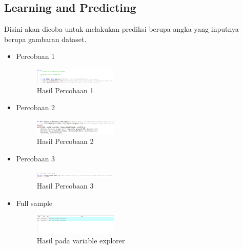 \subsection{Learning and Predicting}
Disini akan dicoba untuk melakukan prediksi berupa angka yang inputnya berupa gambaran dataset. 
\begin{itemize}
	\item Percobaan 1  \hfill \break 
	\begin{figure}[H]
		\includegraphics[width=4cm]{figures/1174035/chapter1/3_1_hasil.png}
		\centering
		\caption{Hasil Percobaan 1}
	\end{figure}
	\item Percobaan 2 \hfill \break 
	\begin{figure}[H]
		\includegraphics[width=4cm]{figures/1174035/chapter1/3_2_hasil.png}
		\centering
		\caption{Hasil Percobaan 2}
	\end{figure}
	\item Percobaan 3  \hfill \break 
	\begin{figure}[H]
		\includegraphics[width=4cm]{figures/1174035/chapter1/3_3_hasil.png}
		\centering
		\caption{Hasil Percobaan 3}
	\end{figure}
	\item Full sample \hfill \break 
	\begin{figure}[H]
		\includegraphics[width=4cm]{figures/1174035/chapter1/3_var.png}
		\centering
		\caption{Hasil pada variable explorer}
	\end{figure}
\end{itemize}
